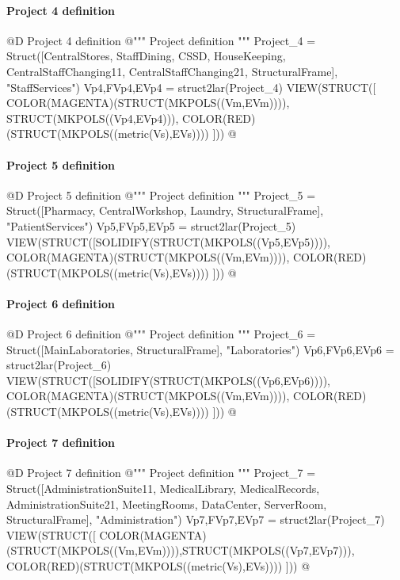 \documentclass[11pt,oneside]{article}    %
\begin{document}
\paragraph{Project 4 definition}
@D Project 4 definition
@{""" Project definition """
Project_4 = Struct([CentralStores, StaffDining, CSSD, HouseKeeping,  
		CentralStaffChanging11, CentralStaffChanging21, StructuralFrame], "StaffServices")
Vp4,FVp4,EVp4 = struct2lar(Project_4)
VIEW(STRUCT([ COLOR(MAGENTA)(STRUCT(MKPOLS((Vm,EVm)))), STRUCT(MKPOLS((Vp4,EVp4))),
COLOR(RED)(STRUCT(MKPOLS((metric(Vs),EVs)))) ]))
@}

\paragraph{Project 5 definition}
@D Project 5 definition
@{""" Project definition """
Project_5 = Struct([Pharmacy, CentralWorkshop, Laundry, StructuralFrame], "PatientServices")
Vp5,FVp5,EVp5 = struct2lar(Project_5)
VIEW(STRUCT([SOLIDIFY(STRUCT(MKPOLS((Vp5,EVp5)))), COLOR(MAGENTA)(STRUCT(MKPOLS((Vm,EVm)))),
COLOR(RED)(STRUCT(MKPOLS((metric(Vs),EVs)))) ]))
@}

\paragraph{Project 6 definition}
@D Project 6 definition
@{""" Project definition """
Project_6 = Struct([MainLaboratories, StructuralFrame], "Laboratories")
Vp6,FVp6,EVp6 = struct2lar(Project_6)
VIEW(STRUCT([SOLIDIFY(STRUCT(MKPOLS((Vp6,EVp6)))), COLOR(MAGENTA)(STRUCT(MKPOLS((Vm,EVm)))),
COLOR(RED)(STRUCT(MKPOLS((metric(Vs),EVs)))) ]))
@}

\paragraph{Project 7 definition}
@D Project 7 definition
@{""" Project definition """
Project_7 = Struct([AdministrationSuite11, MedicalLibrary, MedicalRecords, 
			AdministrationSuite21, MeetingRooms, DataCenter, ServerRoom, StructuralFrame], 
			"Administration")
Vp7,FVp7,EVp7 = struct2lar(Project_7)
VIEW(STRUCT([ COLOR(MAGENTA)(STRUCT(MKPOLS((Vm,EVm)))),STRUCT(MKPOLS((Vp7,EVp7))),
COLOR(RED)(STRUCT(MKPOLS((metric(Vs),EVs)))) ]))
@}
\end{document}
